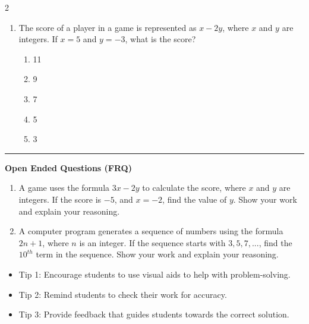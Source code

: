 \documentclass[10pt]{article}
\begin{document}
\begin{multicols}{2}
\begin{enumerate}[label=\textbf{Q\arabic*.}, leftmargin=*, itemsep=6pt, parsep=0pt]
  \item \small The score of a player in a game is represented as $x - 2y$, where $x$ and $y$ are integers. If $x = 5$ and $y = -3$, what is the score?
  \begin{enumerate}[label=(\Alph*), leftmargin=0.6cm, nosep, itemsep=2pt]
    \item 11
    \item 9
    \item 7
    \item 5
    \item 3
  \end{enumerate}

\end{enumerate}
\end{multicols}

\vspace{-0.2cm}
\hrule
\vspace{0.2cm}
\textbf{\small Open Ended Questions (FRQ)}
\begin{enumerate}[label=\textbf{Q\arabic*.}, start=9, itemsep=5pt, topsep=0pt]

  \item \small A game uses the formula $3x - 2y$ to calculate the score, where $x$ and $y$ are integers. If the score is $-5$, and $x = -2$, find the value of $y$. Show your work and explain your reasoning. \vspace{2cm}

  \item \small A computer program generates a sequence of numbers using the formula $2n + 1$, where $n$ is an integer. If the sequence starts with $3, 5, 7, ...$, find the $10^{th}$ term in the sequence. Show your work and explain your reasoning. \vspace{2cm}

\end{enumerate}

\vfill

\begin{tcolorbox}[colback=blue!5, colframe=mainblue!50, title=\small \textbf{Chef's Tips}, fonttitle=\bfseries, bottom=1mm]
\begin{itemize}[noitemsep, topsep=2pt, leftmargin=0.5cm]
  \item \scriptsize Tip 1: Encourage students to use visual aids to help with problem-solving.\item \scriptsize Tip 2: Remind students to check their work for accuracy.\item \scriptsize Tip 3: Provide feedback that guides students towards the correct solution.
\end{itemize}
\end{tcolorbox}
\end{document}
